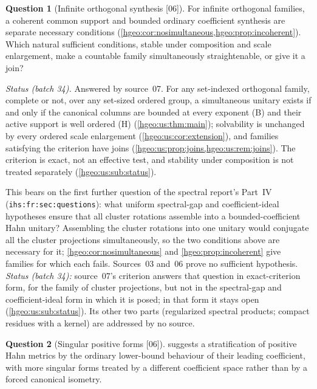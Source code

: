 \documentclass[11pt,letterpaper]{article}
\numberwithin{equation}{section}
\theoremstyle{definition}
\newtheorem{question}[question]{Question}
\theoremstyle{remark}
\newcommand{\src}[1]{\textup{\textsf{\small[#1]}}}
\newcommand{\replabel}[1]{\nolinkurl{#1}}
\begin{document}
\begin{question}[Infinite orthogonal synthesis \src{06}]\label{hgeo:q:synthesis}
For infinite orthogonal families, a coherent common support and bounded
ordinary coefficient synthesis are separate necessary conditions
(\cref{hgeo:cor:nosimultaneous,hgeo:prop:incoherent}). Which natural
sufficient conditions, stable under composition and scale enlargement, make
a countable family simultaneously straightenable, or give it a join?
\end{question}

\noindent\emph{Status (batch 34).} Answered by source~07. For any set-indexed
orthogonal family, complete or not, over any set-sized ordered group, a
simultaneous unitary exists if and only if the canonical columns are bounded
at every exponent (B) and their active support is well ordered (H)
(\cref{hgeo:us:thm:main}); solvability is unchanged by every ordered scale
enlargement (\cref{hgeo:us:cor:extension}), and families satisfying the
criterion have joins (\cref{hgeo:us:prop:joins,hgeo:us:rem:joins}). The
criterion is exact, not an effective test, and stability under composition is
not treated separately (\cref{hgeo:us:sub:status}).

This bears on the first further question of the spectral report's Part~IV
(\replabel{ihs:fr:sec:questions}): what uniform spectral-gap and
coefficient-ideal hypotheses ensure that all cluster rotations assemble into
a bounded-coefficient Hahn unitary? Assembling the cluster rotations into one
unitary would conjugate all the cluster projections simultaneously, so the
two conditions above are necessary for it; \cref{hgeo:cor:nosimultaneous}
and \cref{hgeo:prop:incoherent} give families for which each fails. Sources~03
and~06 prove no sufficient hypothesis. \emph{Status (batch 34):} source~07's
criterion answers that question in exact-criterion form, for the family of
cluster projections, but not in the spectral-gap and coefficient-ideal form in
which it is posed; in that form it stays open (\cref{hgeo:us:sub:status}).
Its other two parts (regularized spectral products; compact residues with a
kernel) are addressed by no source.

\begin{question}[Singular positive forms \src{06}]\label{hgeo:q:metric}
 suggests a stratification of positive Hahn metrics by
the ordinary lower-bound behaviour of their leading coefficient, with more
singular forms treated by a different coefficient space rather than by a
forced canonical isometry.
\end{question}
\end{document}
